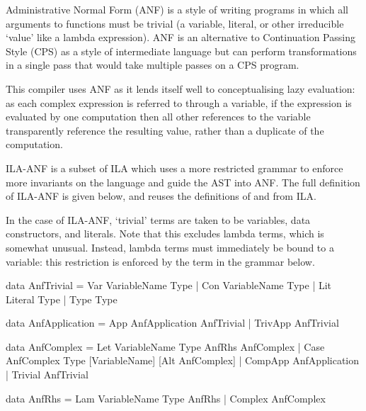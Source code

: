 \documentclass[dissertation.tex]{subfiles}
\begin{document}
{{{            Administrative Normal Form (ANF) is a style of writing programs in which all arguments to functions must be
            trivial (a variable, literal, or other irreducible `value' like a lambda expression). ANF is an alternative
            to Continuation Passing Style (CPS) as a style of intermediate language but can perform transformations in a
            single pass that would take multiple passes on a CPS program\cite{ANF}.

            This compiler uses ANF as it lends itself well to conceptualising lazy evaluation: as each complex
            expression is referred to through a variable, if the expression is evaluated by one computation then all
            other references to the variable transparently reference the resulting value, rather than a duplicate of the
            computation.

            ILA-ANF is a subset of ILA which uses a more restricted grammar to enforce more invariants on the language
            and guide the AST into ANF. The full definition of ILA-ANF is given below, and reuses the definitions of
             and  from ILA.

            In the case of ILA-ANF, `trivial' terms are taken to be variables, data constructors, and literals. Note
            that this excludes lambda terms, which is somewhat unusual. Instead, lambda terms must immediately be bound
            to a variable: this restriction is enforced by the  term in the grammar below.


            \begin{haskellfigure}
            data AnfTrivial = Var VariableName Type
                            | Con VariableName Type
                            | Lit Literal Type
                            | Type Type

            data AnfApplication = App AnfApplication AnfTrivial
                                | TrivApp AnfTrivial

            data AnfComplex = Let VariableName Type AnfRhs AnfComplex
                            | Case AnfComplex Type [VariableName] [Alt AnfComplex]
                            | CompApp AnfApplication
                            | Trivial AnfTrivial

            data AnfRhs = Lam VariableName Type AnfRhs
                        | Complex AnfComplex
            \end{haskellfigure}

}}}
\end{document}
